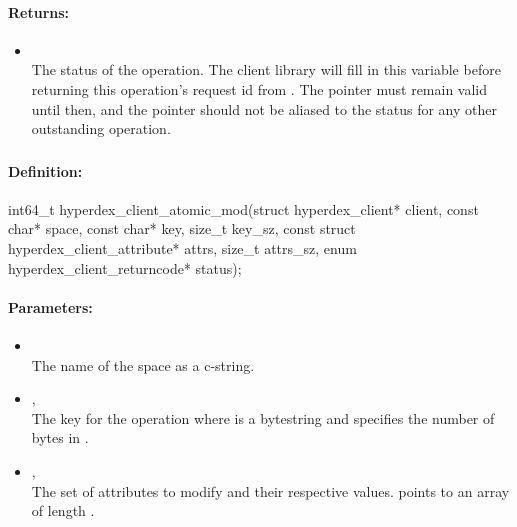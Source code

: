 \paragraph{Returns:}
\begin{itemize}[noitemsep]
\item {}\\
The status of the operation.  The client library will fill in this variable before returning this operation's request id from .  The pointer must remain valid until then, and the pointer should not be aliased to the status for any other outstanding operation.
\end{itemize}

\pagebreak
\subsubsection{}
\label{api:c:atomic_mod}


\paragraph{Definition:}
\begin{ccode}
int64_t hyperdex_client_atomic_mod(struct hyperdex_client* client,
        const char* space,
        const char* key, size_t key_sz,
        const struct hyperdex_client_attribute* attrs, size_t attrs_sz,
        enum hyperdex_client_returncode* status);
\end{ccode}

\paragraph{Parameters:}
\begin{itemize}[noitemsep]
\item {}\\
The name of the space as a c-string.
\item {}, \\
The key for the operation where  is a bytestring and  specifies the number of bytes in .
\item {}, \\
The set of attributes to modify and their respective values.   points to an array of length .
\end{itemize}

